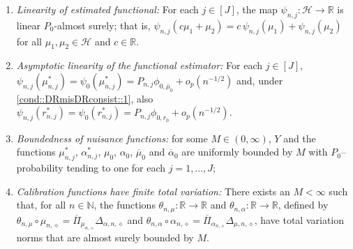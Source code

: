 \documentclass[11pt]{article}
\theoremstyle{plain}
\begin{document}
 
\begin{enumerate}[label=\bf{C\arabic*)}, ref={C\arabic*}, resume=cond1]

  \item \textit{Linearity of estimated functional:}\label{cond::estboundedlinearcross}
For each \(j \in [J]\), the map \(\psi_{n,j}:\mathcal{H}\to\mathbb{R}\) is linear
\(P_0\)-almost surely; that is,
\(\psi_{n,j}(c\mu_1+\mu_2)=c\,\psi_{n,j}(\mu_1)+\psi_{n,j}(\mu_2)\) for all
\(\mu_1,\mu_2\in\mathcal{H}\) and \(c\in\mathbb{R}\).
            \item \textit{Asymptotic linearity of the functional estimator:} \label{cond::DRremainder}
For each $j \in [J]$, $\psi_{n,j}(\mu_{n,j}^*) = \psi_0(\mu_{n,j}^*)   =  P_{n,j} \phi_{0,\overline{\mu}_0} + o_p(n^{-1/2})$ and, under \ref{cond::DRmisDRconsist::1}, also $ \psi_{n,j}(r_{n,j}^*) = \psi_0(r_{n,j}^*)  = P_{n,j}\phi_{0,r_0} + o_p(n^{-1/2})$.
     \item \textit{Boundedness of nuisance functions:} \label{cond::estnuisbound} for some $M\in(0, \infty)$, $Y$ and the functions $\mu_{n,j}^*$, $\alpha_{n,j}^*$, $\mu_0$, $\alpha_0$, $\overline{\mu}_0$ and $\overline{\alpha}_0$ are uniformly bounded by $M$ with $P_0$--probability tending to one for each $j=1,\ldots,J$; \label{cond::bound}
      \item \textit{Calibration functions have finite total variation:} There exists an $M < \infty$ such that, for all $n \in \mathbb{N}$, the functions $\theta_{n,\mu}: \mathbb{R} \to \mathbb{R}$ and $\theta_{n,\alpha}: \mathbb{R} \to \mathbb{R}$, defined by $\theta_{n,\mu} \circ \mu_{n,\diamond} = \overline{\Pi}_{\mu_{n,\diamond}} \Delta_{\alpha,n,\diamond}$ and $\theta_{n,\alpha} \circ \alpha_{n,\diamond} = \overline{\Pi}_{\alpha_{n,\diamond}} \Delta_{\mu,n,\diamond}$, have total variation norms that are almost surely bounded by $M$. \label{cond::variation}
 



\end{enumerate}
\end{document}
